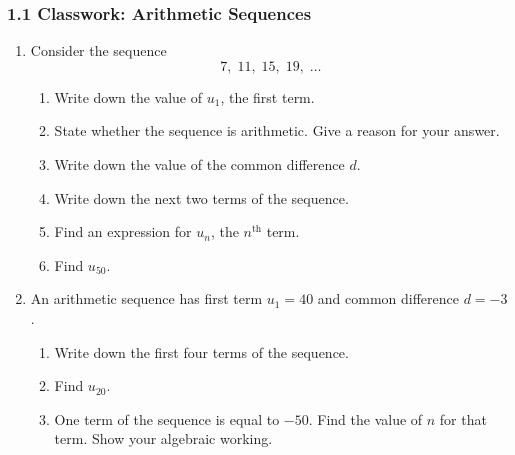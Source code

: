 \documentclass[12pt, twoside]{article}
\begin{document}
\subsubsection*{1.1 Classwork: Arithmetic Sequences}

\begin{enumerate}[itemsep=0.15cm]

\item[1.]

Consider the sequence
$$7,\; 11,\; 15,\; 19,\; \ldots$$

\begin{enumerate}[itemsep=0.1cm]
  \item Write down the value of $u_{1}$, the first term.
  \item State whether the sequence is arithmetic. Give a reason for
  your answer.
  \item Write down the value of the common difference $d$.
  \item Write down the next two terms of the sequence.
  \item Find an expression for $u_{n}$, the $n^{\text{th}}$ term.

  \item Find $u_{50}$.
\end{enumerate}


\newpage

\item[2.]

An arithmetic sequence has first term $u_{1} = 40$ and common
difference $d = -3$.

\begin{enumerate}[itemsep=0.1cm]
  \item Write down the first four terms of the sequence.
  \item Find $u_{20}$.
  \item One term of the sequence is equal to $-50$. Find the value of
  $n$ for that term. Show your algebraic working.
\end{enumerate}


\end{enumerate}
\end{document}

